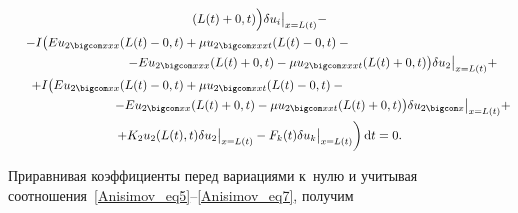 \begin{multline}
{{(L(t)+0, t)}}\Bigr)\delta u_i\big|_{x=L(t)}-

\\%

-I\bigl(Eu_{2 \bigcom xxx}(L(t)-0, t)+\mu u_{2 \bigcom xxxt}(L(t)-0, t)- {}

\hspace{4cm}

\\%

\hspace{3cm}

-Eu_{2 \bigcom xxx}(L(t)+0, t)-\mu u_{2 \bigcom xxxt}(L(t)+0, t)\bigr)\delta u_2\big|_{x=L(t)}+

\\%

+I\bigl(Eu_{2 \bigcom xx}(L(t)-0, t)+\mu u_{2 \bigcom xxt}(L(t)-0, t)- {}

\hspace{4cm}

\\%

\hspace{3cm}

-Eu_{2 \bigcom xx}(L(t)+0, t)-\mu u_{2 \bigcom xxt}(L(t)+0, t)\bigr)\delta u_{2 \bigcom x}\big|_{x=L(t)}+ \\%

+K_2u_2( L(t), t )\delta u_2\big|_{x=L(t)}- 

F_k(t)\delta u_k\big|_{x=L(t)}\biggr)\,\mathrm{d}t=0.

\end{multline}

Приравнивая коэффициенты перед вариациями к~нулю и учитывая соотношения~\eqref{Anisimov_eq5}--\eqref{Anisimov_eq7}, получим

